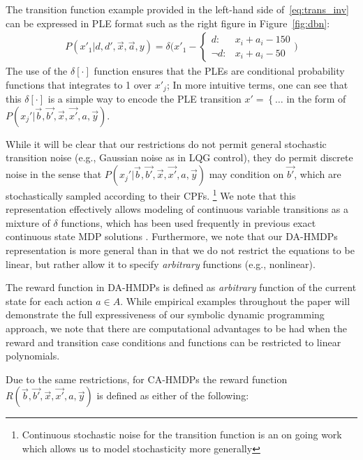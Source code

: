 \documentclass[twoside,11pt]{article}
\begin{document}
The transition function example provided in the left-hand side of~\eqref{eq:trans_inv} can be expressed in PLE format such as the right figure in Figure~\ref{fig:dbn}:
\begin{align*}
P(x'_1 | d, d',\vec{x},\vec{a}, y) = \delta \Bigg( x'_1 -  \begin{cases}
d  : & x_i + a_i - 150 \\
\neg d : & x_i + a_i - 50    
\end{cases} \Bigg) 
\end{align*}
The use of the $\delta[\cdot]$ function ensures that the PLEs are conditional
probability functions that integrates to 1 over $x'_j$; In more intuitive
terms, one can see that this $\delta[\cdot]$ is a simple way to encode
the PLE transition $x' = \left\{ \ldots \right.$ in the form of 
$P(x_j'|\vec{b},\vec{b'},\vec{x},\vec{x'},a,\vec{y})$.

While it will be clear that our restrictions do not permit general stochastic transition noise (e.g., Gaussian noise as in LQG control), they do permit discrete noise in the sense that
$P(x_j'|\vec{b},\vec{b'},\vec{x},\vec{x'},a,\vec{y})$ may condition on
$\vec{b'}$, which are stochastically sampled according to their CPFs.
\footnote{Continuous stochastic noise for the transition function is an on going work which allows us to model stochasticity more generally}
We note that this representation effectively allows modeling of
continuous variable transitions as a mixture of $\delta$ functions,
which has been used frequently in previous exact continuous state MDP
solutions \cite{feng04,hao09}.
Furthermore, we note that our
DA-HMDPs representation is more general than \cite{feng04,li05,hao09} in that
we do not restrict the equations to be linear, but rather
allow it to specify \emph{arbitrary} functions (e.g., nonlinear). 

The reward function in DA-HMDPs is defined as \emph{arbitrary} function of the current state for each action $a \in A$. 
While  empirical examples throughout the paper will demonstrate the full expressiveness of our symbolic dynamic programming approach, we note that there are computational advantages to be had when the reward and transition case conditions and functions can be restricted to linear polynomials.  

Due to the same restrictions, for CA-HMDPs the reward function $R(\vec{b},\vec{b'},\vec{x},\vec{x'}, a,\vec{y})$ is defined as either of the following:
\end{document}
